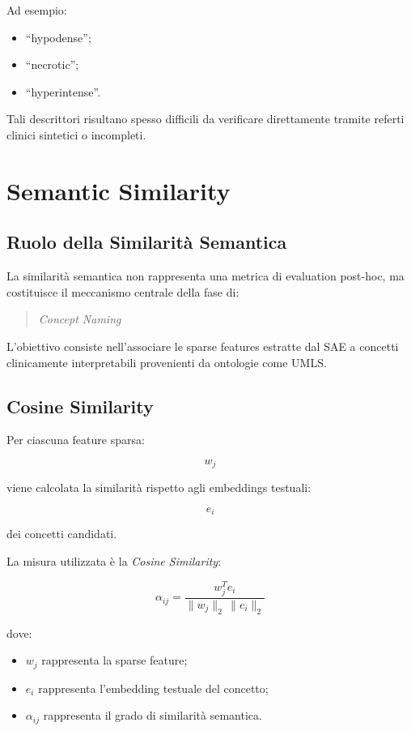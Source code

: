 Ad esempio:

\begin{itemize}
    \item ``hypodense'';
    \item ``necrotic'';
    \item ``hyperintense''.
\end{itemize}

Tali descrittori risultano spesso difficili da verificare direttamente tramite referti clinici sintetici o incompleti.

\section{Semantic Similarity}

\subsection{Ruolo della Similarità Semantica}

La similarità semantica non rappresenta una metrica di evaluation post-hoc, ma costituisce il meccanismo centrale della fase di:

\begin{quote}
\textit{Concept Naming}
\end{quote}

L'obiettivo consiste nell'associare le sparse features estratte dal SAE a concetti clinicamente interpretabili provenienti da ontologie come UMLS.

\subsection{Cosine Similarity}

Per ciascuna feature sparsa:

\[
w_j
\]

viene calcolata la similarità rispetto agli embeddings testuali:

\[
e_i
\]

dei concetti candidati.

La misura utilizzata è la \textit{Cosine Similarity}:

\[
\alpha_{ij} =
\frac{w_j^{T} e_i}
{\lVert w_j \rVert_2 \, \lVert e_i \rVert_2}
\]

dove:

\begin{itemize}
    \item $w_j$ rappresenta la sparse feature;
    \item $e_i$ rappresenta l'embedding testuale del concetto;
    \item $\alpha_{ij}$ rappresenta il grado di similarità semantica.
\end{itemize}

